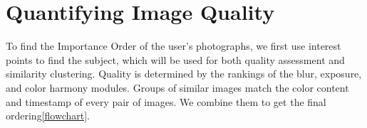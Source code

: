 \documentclass{article}
\begin{document}


\section{Quantifying Image Quality}
\begin{figure*}
  \centering
  \caption{Interest points are used to find the subject. Blur detection, color harmony, and exposure algorithms calculate an image's quality rating. The color distribution of the local subject and global image, coupled with the timestamp, cluster images into groups. A reordering of the input results, allowing the user to remove images at the end of this ordering.}
  \label{flowchart}
\end{figure*}

To find the Importance Order of the user's photographs, we first use interest points to find the subject, which will be used for both quality assessment and similarity clustering. Quality is determined by the rankings of the blur, exposure, and color harmony modules. Groups of similar images match the color content and timestamp of every pair of images. We combine them to get the final ordering\ref{flowchart}.
\end{document}
